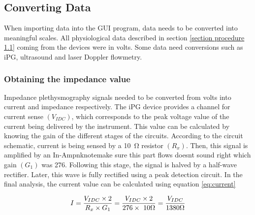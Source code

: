 \subsection{Converting Data}
\label{section procedure 2.1}
When importing data into the GUI program, data needs to be converted into meaningful scales. All physiological data described in section \ref{section procedure 1.1} coming from the devices were in volts. Some data need conversions such as iPG, ultrasound and laser Doppler flowmetry.


\subsubsection{Obtaining the impedance value}
Impedance plethysmography signals needed to be converted from volts into current and impedance respectively. The iPG device provides a channel for current sense $(V_{IDC})$, which corresponds to the peak voltage value of the current being delivered by the instrument. This value can be calculated by knowing the gain of the different stages of the circuits. According to the circuit schematic, current is being sensed by a \SI{10}{\ohm} resistor $(R_x)$. Then, this signal is amplified by an In-Ampnknote{make sure this part flows doesnt sound right} which gain $(G_1)$ was 276. Following this stage, the signal is halved by a half-wave rectifier. Later, this wave is fully rectified using a peak detection circuit. In the final analysis, the current value can be calculated using equation \ref{eq:current}

\begin{align}
	\label{eq:current}
	I = \frac{V_{IDC} \times 2}{R_x \times G_1} = \frac{V_{IDC} \times 2}{276 \times\ 10 \Omega} = \frac{V_{IDC}}{1380 \Omega} \tagaddtext{[\si{\ampere}]}
\end{align}



